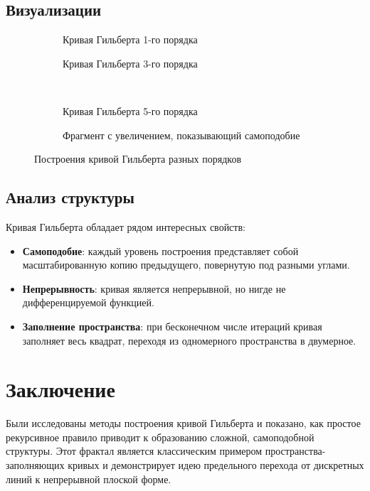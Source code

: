 \subsection{Визуализации}

\begin{figure}[H]
    \centering
    \begin{subfigure}{0.45\textwidth}
        \caption{Кривая Гильберта 1-го порядка}
    \end{subfigure}
    \hfill
    \begin{subfigure}{0.45\textwidth}
        \caption{Кривая Гильберта 3-го порядка}
    \end{subfigure}
    \\
    \begin{subfigure}{0.45\textwidth}
        \caption{Кривая Гильберта 5-го порядка}
    \end{subfigure}
    \hfill
    \begin{subfigure}{0.45\textwidth}
        \caption{Фрагмент с увеличением, показывающий самоподобие}
    \end{subfigure}
    \caption{Построения кривой Гильберта разных порядков}
\end{figure}

\subsection{Анализ структуры}

Кривая Гильберта обладает рядом интересных свойств:
\begin{itemize}
    \item \textbf{Самоподобие}: каждый уровень построения представляет собой масштабированную копию предыдущего, повернутую под разными углами.
    \item \textbf{Непрерывность}: кривая является непрерывной, но нигде не дифференцируемой функцией.
    \item \textbf{Заполнение пространства}: при бесконечном числе итераций кривая заполняет весь квадрат, переходя из одномерного пространства в двумерное.
\end{itemize}

\section*{Заключение}

Были исследованы методы построения кривой Гильберта и показано, как простое рекурсивное правило приводит к образованию сложной, самоподобной структуры. Этот фрактал является классическим примером пространства-заполняющих кривых и демонстрирует идею предельного перехода от дискретных линий к непрерывной плоской форме.



